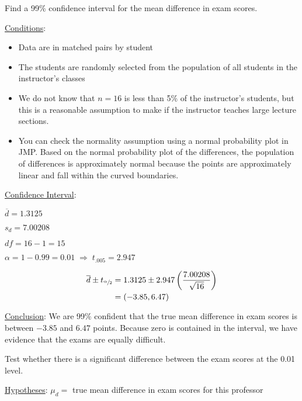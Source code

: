 \documentclass[noanswers]{exam}
\begin{document}
\vspace{3mm}

\begin{questions} 

\question Find a 99\% confidence interval for the mean difference in exam scores.

\begin{solution}[\stretch{1}]
\underline{Conditions}:
\begin{itemize}
	\item Data are in matched pairs by student
	\item The students are randomly selected from the population of all students in the instructor's classes
	\item We do not know that $n=16$ is less than 5\% of the instructor's students, but this is a reasonable assumption to make if the instructor teaches large lecture sections.
	\item You can check the normality assumption using a normal probability plot in JMP. Based on the normal probability plot of the differences, the population of differences is approximately normal because the points are approximately linear and fall within the curved boundaries.
\end{itemize}

\underline{Confidence Interval}: 

$\overline{d}=1.3125$

$s_d=7.00208$

$df=16-1=15$

$\alpha=1-0.99=0.01\;\Rightarrow\; t_{.005}=2.947$

\begin{align*}
\overline{d}\pm t_{\sfrac{\alpha}{2}} &= 1.3125 \pm 2.947\left(\frac{7.00208}{\sqrt{16}}\right) \\
&= (-3.85, 6.47)
\end{align*}

\underline{Conclusion}: We are 99\% confident that the true mean difference in exam scores is between $-3.85$ and $6.47$ points. Because zero is contained in the interval, we have evidence that the exams are equally difficult.

\end{solution}



\question Test whether there is a significant difference between the exam scores at the 0.01 level.

\begin{solution}[\stretch{1}]
\underline{Hypotheses}:
$\mu_d=$ true mean difference in exam scores for this professor


\end{solution}
\end{questions}
\end{document}
